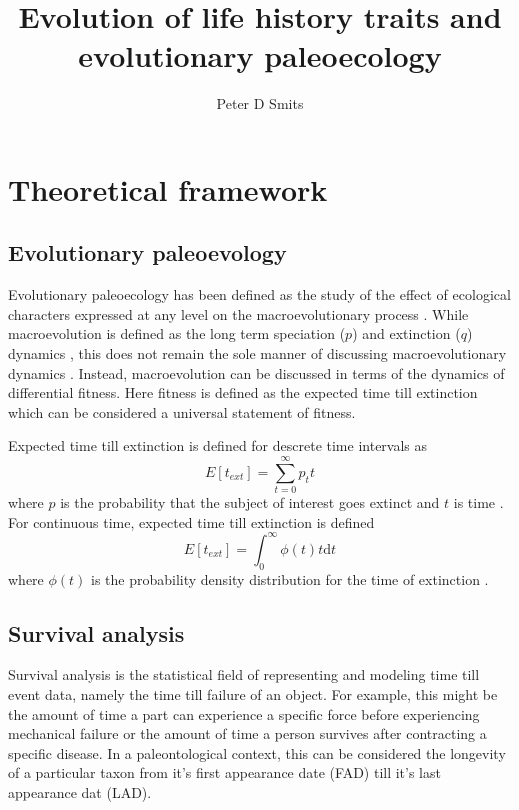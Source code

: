 \documentclass[12pt,letterpaper]{article}
\title{Evolution of life history traits and evolutionary paleoecology}
\author[1]{Peter D Smits}
\affil[1]{\footnotesize{\href{mailto:psmits@uchicago.edu}{psmits@uchicago.edu}, Committee on Evolutionary Biology, University of Chicago}}
\begin{document}
\maketitle

\linenumbers
\modulolinenumbers[2]

\section{Theoretical framework}
\subsection{Evolutionary paleoevology}
Evolutionary paleoecology has been defined as the study of the effect of ecological characters expressed at any level on the macroevolutionary process \citep{Kitchell1985a}. While macroevolution is defined as the long term speciation (\(p\)) and extinction (\(q\)) dynamics \citep{Jablonski2008a}, this does not remain the sole manner of discussing macroevolutionary dynamics \citep{Kitchell1985a,Kitchell1990}. Instead, macroevolution can be discussed in terms of the dynamics of differential fitness. Here fitness is defined as the expected time till extinction \citep{Cooper1984} which can be considered a universal statement of fitness.

Expected time till extinction is defined for descrete time intervals as 
\begin{equation}
  E[t_{ext}] = \sum_{t = 0}^{\infty} p_{t} t
  \label{eq:ete_d}
\end{equation}
where \(p\) is the probability that the subject of interest goes extinct and \(t\) is time \citep{Cooper1984}. For continuous time, expected time till extinction is defined 
\begin{equation}
  E[t_{ext}] = \int_{0}^{\infty} \phi(t) t \mathrm{d}t
  \label{eq:ete_c}
\end{equation}
where \(\phi(t)\) is the probability density distribution for the time of extinction \citep{Cooper1984}.


\subsection{Survival analysis}
Survival analysis is the statistical field of representing and modeling time till event data, namely the time till failure of an object. For example, this might be the amount of time a part can experience a specific force before experiencing mechanical failure or the amount of time a person survives after contracting a specific disease. In a paleontological context, this can be considered the longevity of a particular taxon from it's first appearance date (FAD) till it's last appearance dat (LAD).
\end{document}
